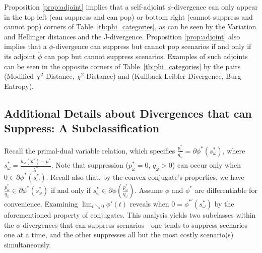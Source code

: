 \documentclass[opre,nonblindrev]{informs3} %
\newcommand{\x}{\mathbf{x}}
\begin{document}
Proposition \ref{prop:adjoint} implies that a self-adjoint $\phi$-divergence can only appear in the top left (can suppress and can pop) or bottom right (cannot suppress and cannot pop) corners of Table~\ref{tb:phi_categories}, as can be seen by the Variation and Hellinger distances and the J-divergence. 
Proposition \ref{prop:adjoint} also implies that a $\phi$-divergence can suppress but cannot pop scenarios if and only if its adjoint $\tilde{\phi}$ can pop but cannot suppress scenarios. 
Examples of such adjoints can be seen in the opposite corners of Table~\ref{tb:phi_categories} by the pairs (Modified $\chi^2$-Distance,  $\chi^2$-Distance) and (Kullback-Leibler Divergence, Burg Entropy).  







\subsection{Additional Details about Divergences that can Suppress: A Subclassification}
\label{ssec:suppress}

Recall the primal-dual variable relation, which specifies $\frac{p^*_\omega}{q_\omega} = \partial \phi^*(s^*_\omega)$, where $s^*_\omega=\frac{h_{\omega}(\x^*)-\mu^*}{\lambda^*}$. 
Note that suppression ($p^*_\omega = 0$, $q_\omega > 0$) can occur only when $0 \in \partial \phi^*(s^*_\omega)$.
Recall also that, by the convex conjugate's properties, we have  $\frac{p^*_\omega}{q_\omega} \in \partial \phi^*(s^*_\omega)$ if and only if $s^*_\omega \in \partial \phi(\frac{p^*_\omega}{q_\omega})$. 
Assume  $\phi$ and $\phi^*$ are differentiable for convenience. 
Examining $\lim_{t \searrow 0} \phi'(t)$ reveals when $0=\phi^{* \prime} (s^*_\omega)$ by the aforementioned property of conjugates. 
This analysis yields two subclasses within the $\phi$-divergences that can suppress scenarios---one tends to suppress scenarios one at a time, and the other suppresses all but the most costly scenario(s) simultaneously.
\end{document}
